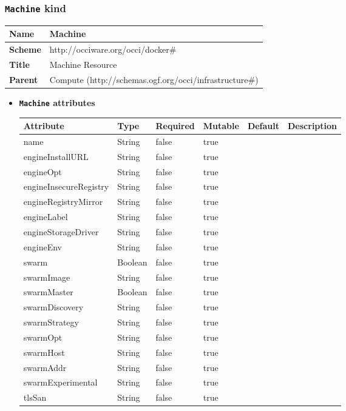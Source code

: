 \subsubsection{\texttt{Machine} kind}
\begin{center}
\begin{tabular}{|l|l|}
  \hline
  \textbf{Name} & Machine \\
  \hline  
  \textbf{Scheme} & http://occiware.org/occi/docker\# \\
  \hline
  \textbf{Title} & Machine Resource \\
  \hline
  \textbf{Parent} & Compute (http://schemas.ogf.org/occi/infrastructure\#) \\
  \hline
\end{tabular}
\end{center}
\begin{itemize}
\item \textbf{\texttt{Machine} attributes}

\begin{tabularx}{\textwidth}{|l|l|p{1.4cm}|p{1.3cm}|l|X|}
  \hline
  \textbf{Attribute} & \textbf{Type} & \textbf{Required} & \textbf{Mutable} & \textbf{Default} & \textbf{Description} \\
  \hline  
  name & String & false & true &  &  \\
  \hline
  engineInstallURL & String & false & true &  &  \\
  \hline
  engineOpt & String & false & true &  &  \\
  \hline
  engineInsecureRegistry & String & false & true &  &  \\
  \hline
  engineRegistryMirror & String & false & true &  &  \\
  \hline
  engineLabel & String & false & true &  &  \\
  \hline
  engineStorageDriver & String & false & true &  &  \\
  \hline
  engineEnv & String & false & true &  &  \\
  \hline
  swarm & Boolean & false & true &  &  \\
  \hline
  swarmImage & String & false & true &  &  \\
  \hline
  swarmMaster & Boolean & false & true &  &  \\
  \hline
  swarmDiscovery & String & false & true &  &  \\
  \hline
  swarmStrategy & String & false & true &  &  \\
  \hline
  swarmOpt & String & false & true &  &  \\
  \hline
  swarmHost & String & false & true &  &  \\
  \hline
  swarmAddr & String & false & true &  &  \\
  \hline
  swarmExperimental & String & false & true &  &  \\
  \hline
  tlsSan & String & false & true &  &  \\
  \hline
\end{tabularx}
\end{itemize}



